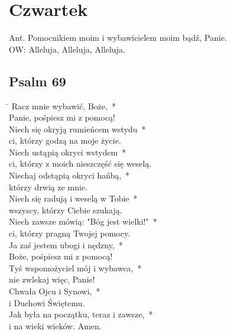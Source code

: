 \section*{Czwartek}
Ant. Pomocnikiem moim i wybawicielem moim bądź, Panie.\\
OW: Alleluja, Alleluja, Alleluja.
\subsection*{Psalm 69}
\begin{tabbing}
\hspace{4mm} \= \>\kill
Racz mnie wybawić, Boże,~*\\
Panie, pośpiesz mi z pomocą!\\
\>Niech się okryją rumieńcem wstydu~*\\
\>ci, którzy godzą na moje życie.\\
Niech ustąpią okryci wstydem~*\\
ci, którzy z moich nieszczęść się weselą.\\
\>Niechaj odstąpią okryci hańbą,~*\\
\>którzy drwią ze mnie.\\
Niech się radują i weselą w Tobie~*\\
wszyscy, którzy Ciebie szukają.\\
\>Niech zawsze mówią: "Bóg jest wielki!"~*\\
\>ci, którzy pragną Twojej pomocy.\\
Ja zaś jestem ubogi i nędzny,~*\\
Boże, pośpiesz mi z pomocą!\\
\>Tyś wspomożyciel mój i wybawca,~*\\
\>nie zwlekaj więc, Panie!\\
Chwała Ojcu i Synowi,~*\\
i Duchowi Świętemu.\\
\>Jak była na początku, teraz i zawsze,~*\\
\>i na wieki wieków. Amen.
\end{tabbing}

